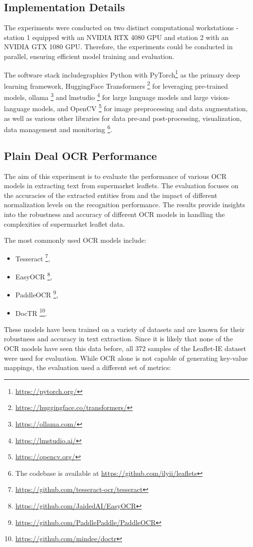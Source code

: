 \documentclass[11pt]{article}
\begin{document}
\subsection{Implementation Details}
The experiments were conducted on two distinct computational workstations - station 1 equipped with an NVIDIA RTX 4080 GPU and station 2 with an NVIDIA GTX 1080 GPU. Therefore, the experiments could be conducted in parallel, ensuring efficient model training and evaluation.

The software stack includegraphics Python with PyTorch\footnote{\href{https://pytorch.org/}{https://pytorch.org/}} as the primary deep learning framework, HuggingFace Transformers \footnote{\href{https://huggingface.co/transformers/}{https://huggingface.co/transformers/}}
for leveraging pre-trained models, ollama \footnote{\href{https://ollama.com/}{https://ollama.com/}}
and lmstudio \footnote{\href{https://lmstudio.ai/}{https://lmstudio.ai/}} for large language models and large vision-language models, and OpenCV \footnote{\href{https://opencv.org/}{https://opencv.org/}} for image preprocessing and data augmentation, as well as various other libraries for data pre-and post-processing, visualization, data management and monitoring \footnote{The codebase is available at \href{https://github.com/ilyii/leaflets}{https://github.com/ilyii/leaflets}}.


\subsection{Plain Deal OCR Performance}
The aim of this experiment is to evaluate the performance of various OCR models in extracting text from supermarket leaflets. The evaluation focuses on the accuracies of the extracted entities from  and the impact of different normalization levels on the recognition performance. The results provide insights into the robustness and accuracy of different OCR models in handling the complexities of supermarket leaflet data.

The most commonly used OCR models include:
\begin{itemize}
    \item Tesseract \footnote{\href{https://github.com/tesseract-ocr/tesseract}{https://github.com/tesseract-ocr/tesseract}},
    \item EasyOCR \footnote{\href{https://github.com/JaidedAI/EasyOCR}{https://github.com/JaidedAI/EasyOCR}},
    \item PaddleOCR \footnote{\href{https://github.com/PaddlePaddle/PaddleOCR}{https://github.com/PaddlePaddle/PaddleOCR}},
    \item DocTR \footnote{\href{https://github.com/mindee/doctr}{https://github.com/mindee/doctr}}.
\end{itemize}
These models have been trained on a variety of datasets and are known for their robustness and accuracy in text extraction. Since it is likely that none of the OCR models have seen this data before, all 372 samples of the Leaflet-IE dataset were used for evaluation. While OCR alone is not capable of generating key-value mappings, the evaluation used a different set of metrics:
\end{document}
